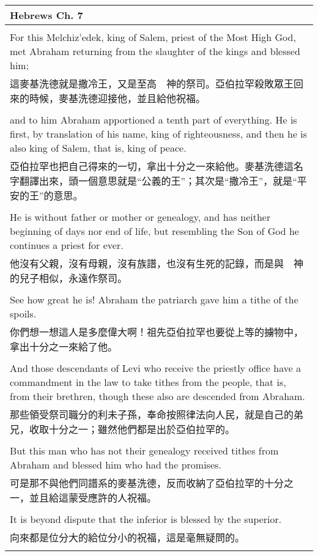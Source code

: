 \begin{tabularx}{\textwidth}{p{}}
\hline
Hebrews Ch. 7 \\
\hline \\
For this Melchiz'edek, king of Salem, priest of the Most High God, met Abraham returning from the slaughter of the kings and blessed him; \\
這麥基洗德就是撒冷王，又是至高　神的祭司。亞伯拉罕殺敗眾王回來的時候，麥基洗德迎接他，並且給他祝福。 \\ \\
and to him Abraham apportioned a tenth part of everything. He is first, by translation of his name, king of righteousness, and then he is also king of Salem, that is, king of peace. \\
亞伯拉罕也把自己得來的一切，拿出十分之一來給他。麥基洗德這名字翻譯出來，頭一個意思就是“公義的王”；其次是“撒冷王”，就是“平安的王”的意思。 \\ \\
He is without father or mother or genealogy, and has neither beginning of days nor end of life, but resembling the Son of God he continues a priest for ever. \\
他沒有父親，沒有母親，沒有族譜，也沒有生死的記錄，而是與　神的兒子相似，永遠作祭司。 \\ \\
See how great he is! Abraham the patriarch gave him a tithe of the spoils. \\
你們想一想這人是多麼偉大啊！祖先亞伯拉罕也要從上等的擄物中，拿出十分之一來給了他。 \\ \\
And those descendants of Levi who receive the priestly office have a commandment in the law to take tithes from the people, that is, from their brethren, though these also are descended from Abraham. \\
那些領受祭司職分的利未子孫，奉命按照律法向人民，就是自己的弟兄，收取十分之一；雖然他們都是出於亞伯拉罕的。 \\ \\
But this man who has not their genealogy received tithes from Abraham and blessed him who had the promises. \\
可是那不與他們同譜系的麥基洗德，反而收納了亞伯拉罕的十分之一，並且給這蒙受應許的人祝福。 \\ \\
It is beyond dispute that the inferior is blessed by the superior. \\
向來都是位分大的給位分小的祝福，這是毫無疑問的。 \\ \\

\end{tabularx}

